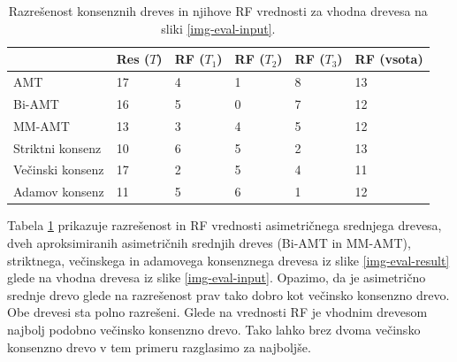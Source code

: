 \documentclass[a4paper, 12pt]{book}
\begin{document}
\begin{table}
	\begin{center}
	{\footnotesize
	\begin{tabular}{ l| l | l | l | l | l }
	~                & Res ($T$) & RF ($T_1$) & RF ($T_2$) & RF ($T_3$) & RF (vsota) \\ \hline
	AMT              & 17          & 4             & 1             & 8             & 13         \\ \hline
	Bi-AMT           & 16          & 5             & 0             & 7             & 12         \\ \hline
	MM-AMT           & 13          & 3             & 4             & 5             & 12         \\ \hline
	Striktni konsenz & 10          & 6             & 5             & 2             & 13         \\ \hline
	Večinski konsenz & 17          & 2             & 5             & 4             & 11         \\ \hline
	Adamov konsenz   & 11          & 5             & 6             & 1             & 12         \\ \hline
	\end{tabular}
	\label{table-eval-1}
	\caption{Razrešenost konsenznih dreves in njihove RF vrednosti za vhodna drevesa na sliki \ref{img-eval-input}.}
	}
	\end{center}		
\end{table}

Tabela \ref{table-eval-1} prikazuje razrešenost in RF vrednosti asimetričnega srednjega drevesa, dveh aproksimiranih
asimetričnih srednjih dreves (Bi-AMT in MM-AMT), striktnega, večinskega in adamovega konsenznega drevesa iz slike 
 \ref{img-eval-result} glede na vhodna drevesa iz slike \ref{img-eval-input}. Opazimo, da je asimetrično srednje 
drevo glede na razrešenost prav tako dobro kot večinsko konsenzno drevo. Obe drevesi sta polno razrešeni. Glede na
vrednosti RF je vhodnim drevesom najbolj podobno večinsko konsenzno drevo. Tako lahko brez dvoma večinsko konsenzno
drevo v tem primeru razglasimo za najboljše.
\end{document}
